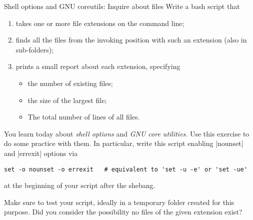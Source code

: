 
\begin{exercise}[Inspirational]{Shell options and GNU coreutils: Inquire about files}
    Write a bash script that
    \begin{enumerate}
        \item takes one or more file extensions on the command line;
        \item finds all the files from the invoking position with such an extension (also in sub-folders);
        \item prints a small report about each extension, specifying
              \begin{itemize}
                  \item the number of existing files;
                  \item the size of the largest file;
                  \item The total number of lines of all files.
              \end{itemize}
    \end{enumerate}

    You learn today about \emph{shell options} and \emph{GNU core utilities}.
    Use this exercise to do some practice with them.
    In particular, write this script enabling \bash|nounset| and \bash|errexit| options via
    \begin{lstlisting}[style=myBash]
        set -o nounset -o errexit   # equivalent to 'set -u -e' or 'set -ue'
    \end{lstlisting}
    at the beginning of your script after the shebang.

    Make sure to test your script, ideally in a temporary folder created for this purpose.
    Did you consider the possibility no files of the given extension exist?
\end{exercise}
